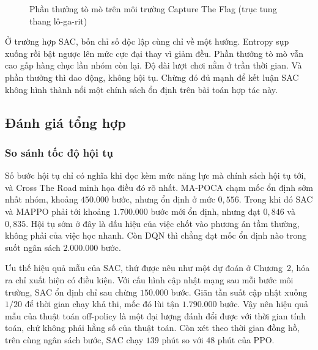 \begin{figure}[H]
    \caption{Phần thưởng tò mò trên môi trường Capture The Flag (trục tung thang
    lô-ga-rit)}
    \label{fig:ctf_curiosity}
\end{figure}

\indent Ở trường hợp SAC, bốn chỉ số độc lập cùng chỉ về một hướng. Entropy sụp xuống rồi
bật ngược lên mức cực đại thay vì giảm đều. Phần thưởng tò mò vẫn cao gấp hàng chục lần
nhóm còn lại. Độ dài lượt chơi nằm ở trần thời gian. Và phần thưởng thì dao động, không
hội tụ. Chừng đó đủ mạnh để kết luận SAC không hình thành nổi một chính sách ổn định trên bài
toán hợp tác này.

\subsection{Đánh giá tổng hợp}

\subsubsection{So sánh tốc độ hội tụ}
\indent Số bước hội tụ chỉ có nghĩa khi đọc kèm mức năng lực mà chính sách hội tụ tới, và
Cross The Road minh họa điều đó rõ nhất. MA-POCA chạm mốc ổn định sớm nhất nhóm, khoảng
$450.000$ bước, nhưng ổn định ở mức $0{,}556$. Trong khi đó SAC và MAPPO phải tới khoảng
$1.700.000$ bước mới ổn định, nhưng đạt $0{,}846$ và
$0{,}835$. Hội tụ sớm ở đây là dấu hiệu của việc chốt vào phương án tầm thường, không phải
của việc học nhanh. Còn DQN thì chẳng đạt mốc ổn định nào trong suốt ngân sách $2.000.000$ bước.

\indent Ưu thế hiệu quả mẫu của SAC, thứ được nêu như một dự đoán ở Chương~2, hóa ra chỉ
xuất hiện có điều kiện. Với cấu hình cập nhật mạng sau mỗi bước môi trường, SAC ổn định chỉ
sau chừng $150.000$ bước. Giãn tần suất cập nhật xuống $1/20$ để thời gian chạy khả thi, mốc đó
lùi tận $1.790.000$ bước. Vậy nên
hiệu quả mẫu của thuật toán off-policy là một đại lượng đánh đổi được với thời gian tính
toán, chứ không phải hằng số của thuật toán. Còn xét theo thời gian đồng hồ, trên cùng
ngân sách bước, SAC chạy $139$ phút so với $48$ phút của PPO.

